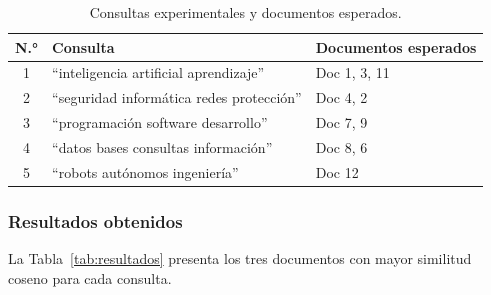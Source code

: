 \begin{table}[H]
\centering
\caption{Consultas experimentales y documentos esperados.}
\label{tab:consultas}
\begin{tabular}{|c|l|l|}
\hline
\textbf{N.°} & \textbf{Consulta} & \textbf{Documentos esperados} \\
\hline
1 & ``inteligencia artificial aprendizaje'' & Doc 1, 3, 11 \\
2 & ``seguridad informática redes protección'' & Doc 4, 2 \\
3 & ``programación software desarrollo'' & Doc 7, 9 \\
4 & ``datos bases consultas información'' & Doc 8, 6 \\
5 & ``robots autónomos ingeniería'' & Doc 12 \\
\hline
\end{tabular}
\end{table}

\subsubsection{Resultados obtenidos}

La Tabla~\ref{tab:resultados} presenta los tres documentos con mayor similitud coseno para cada consulta.

